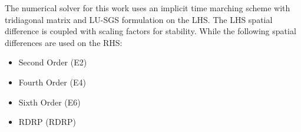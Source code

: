 \documentclass[conf]{new-aiaa}
\begin{document}
%

The numerical solver for this work uses an implicit time marching scheme with
tridiagonal matrix and LU-SGS formulation on the LHS. 
The LHS spatial difference is coupled with scaling factors for stability. 
While the following spatial differences are used on the RHS:
\begin{itemize}
	\item Second Order (E2)
	\item Fourth Order (E4)
	\item Sixth Order (E6)
	\item RDRP  (RDRP)
\end{itemize}
\end{document}

